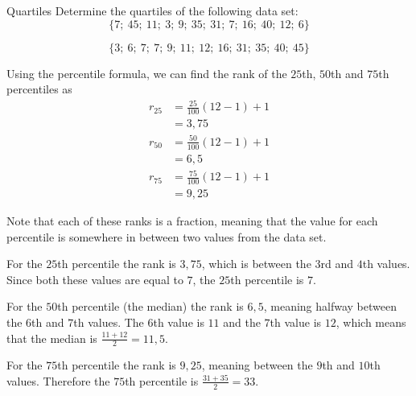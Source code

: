 
\begin{wex}{Quartiles}{
    Determine the quartiles of the following data set:
    \begin{equation}
      \{7;\ 45;\ 11;\ 3;\ 9;\ 35;\ 31;\ 7;\ 16;\ 40;\ 12;\ 6\}
    \end{equation}
}{
    \begin{equation}
      \{3;\ 6;\ 7;\ 7;\ 9;\ 11;\ 12;\ 16;\ 31;\ 35;\ 40;\ 45\}
    \end{equation}


    Using the percentile formula, we can find the rank of the $25$th,
    $50$th and $75$th percentiles as
    \begin{align}
      r_{25} &= \frac{25}{100}\left(12-1\right)+1 \\
            &= 3,75 \\
      r_{50} &= \frac{50}{100}\left(12-1\right)+1 \\
            &= 6,5 \\
      r_{75} &= \frac{75}{100}\left(12-1\right)+1 \\
            &= 9,25
    \end{align}


    Note that each of these ranks is a fraction, meaning that the
    value for each percentile is somewhere in between two values from
    the data set.

    For the $25$th percentile the rank is $3,75$, which is between
    the $3$rd and $4$th values. Since both these values are equal to
    $7$, the $25$th percentile is $7$.

    For the $50$th percentile (the median) the rank is $6,5$, meaning
    halfway between the $6$th and $7$th values. The $6$th value is
    $11$ and the $7$th value is $12$, which means that the median is
    \(\frac{11+12}{2} = 11,5\).

    For the $75$th percentile the rank is $9,25$, meaning between the
    $9$th and $10$th values. Therefore the $75$th percentile is
    \(\frac{31+35}{2} = 33\).

  }
\end{wex}

